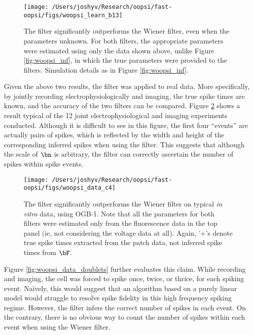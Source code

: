 \begin{figure}[h!]
\centering \texttt{[image: /Users/joshyv/Research/oopsi/fast-oopsi/figs/woopsi\_learn\_b13]}
\caption[parameters may be estimated using the \foopsi filter]{The \foopsi filter significantly outperforms the Wiener filter, even when the parameters unknown.  For both filters, the appropriate parameters were estimated using only the data shown above, unlike Figure \ref{fig:woopsi_inf}, in which the true parameters were provided to the filters. Simulation details as in Figure \ref{fig:woopsi_inf}.} \label{fig:woopsi_learn}
\end{figure}

Given the above two results, the \foopsi filter was applied to real data.  More specifically, by jointly recording electrophysiologically and imaging, the true spike times are known, and the accuracy of the two filters can be compared.  Figure \ref{fig:woopsi_data} shows a result typical of the 12 joint electrophysiological and imaging experiments conducted. Although it is difficult to see in this figure, the first four ``events'' are actually pairs of spikes, which is reflected by the width and height of the corresponding inferred spikes when using the \foopsi filter. %
This suggests that although the scale of $\bn$ is arbitrary, the \foopsi filter can correctly ascertain the number of spikes within spike events.  

\begin{figure}[h!]
\centering \texttt{[image: /Users/joshyv/Research/oopsi/fast-oopsi/figs/woopsi\_data\_c4]}
\caption[\foopsi filter outperforms Wiener filter on biological data]{The \foopsi filter significantly outperforms the Wiener filter on typical \emph{in vitro} data, using OGB-1. Note that all the parameters for both filters were estimated only from the fluorescence data in the top panel (ie, not considering the voltage data at all).  Again, '$+$'s denote true spike times extracted from the patch data, not inferred spike times from $\bF$.} \label{fig:woopsi_data}
\end{figure}


Figure \ref{fig:woopsi_data_doublets} further evaluates this claim.  While recording and imaging, the cell was forced to spike once, twice, or thrice, for each spiking event.  Na\"{i}vely, this would suggest that an algorithm based on a purely linear model would struggle to resolve spike fidelity in this high frequency spiking regime.  However, the \foopsi filter infers the correct number of spikes in each event.  On the contrary, there is no obvious way to count the number of spikes within each event when using the Wiener filter.

